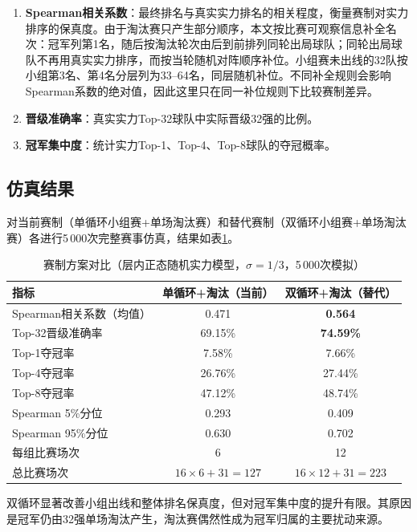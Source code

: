\documentclass[12pt,a4paper]{article}
\begin{document}
\begin{enumerate}[(1)]
  \item \textbf{Spearman相关系数}：最终排名与真实实力排名的相关程度，衡量赛制对实力排序的保真度。由于淘汰赛只产生部分顺序，本文按比赛可观察信息补全名次：冠军列第1名，随后按淘汰轮次由后到前排列同轮出局球队；同轮出局球队不再用真实实力排序，而按当轮随机对阵顺序补位。小组赛未出线的32队按小组第3名、第4名分层列为33--64名，同层随机补位。不同补全规则会影响Spearman系数的绝对值，因此这里只在同一补位规则下比较赛制差异。
  \item \textbf{晋级准确率}：真实实力Top-32球队中实际晋级32强的比例。
  \item \textbf{冠军集中度}：统计实力Top-1、Top-4、Top-8球队的夺冠概率。
\end{enumerate}

\subsection{仿真结果}

对当前赛制（单循环小组赛+单场淘汰赛）和替代赛制（双循环小组赛+单场淘汰赛）各进行5\,000次完整赛事仿真，结果如表\ref{tab:q4_random_strength}。

\begin{table}[H]
  \centering
  \caption{赛制方案对比（层内正态随机实力模型，$\sigma=1/3$，5\,000次模拟）}
  \label{tab:q4_random_strength}
  \begin{tabular}{lcc}
    \toprule
    指标 & 单循环+淘汰（当前） & 双循环+淘汰（替代） \\
    \midrule
    Spearman相关系数（均值） & 0.471 & \textbf{0.564} \\
    Top-32晋级准确率 & 69.15\% & \textbf{74.59\%} \\
    Top-1夺冠率 & 7.58\% & 7.66\% \\
    Top-4夺冠率 & 26.76\% & 27.44\% \\
    Top-8夺冠率 & 47.12\% & 48.74\% \\
    Spearman 5\%分位 & 0.293 & 0.409 \\
    Spearman 95\%分位 & 0.630 & 0.702 \\
    每组比赛场次 & 6 & 12 \\
    总比赛场次 & $16\times6 + 31 = 127$ & $16\times12 + 31 = 223$ \\
    \bottomrule
  \end{tabular}
\end{table}

双循环显著改善小组出线和整体排名保真度，但对冠军集中度的提升有限。其原因是冠军仍由32强单场淘汰产生，淘汰赛偶然性成为冠军归属的主要扰动来源。
\end{document}

